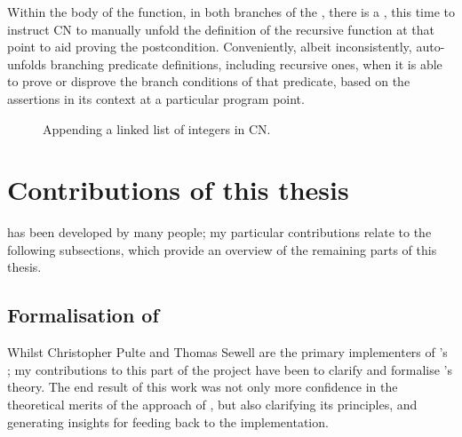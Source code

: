 Within the body of the function, in both branches of the , there is
a , this time to instruct CN to manually unfold the definition
of the recursive function at that point to aid proving the postcondition.
Conveniently, albeit
inconsistently,
 auto-unfolds branching predicate definitions, including recursive ones,
when it is able to prove or disprove the branch conditions of that predicate,
based on the assertions in its context at a particular program point.

\begin{figure}[tp]
    \begin{minipage}{.85\textwidth}
    \end{minipage}%
    \begin{minipage}{.65\textwidth}
    \end{minipage}
    \caption{Appending a linked list of integers in CN.}\label{fig:append-cn}
\end{figure}%

\section{Contributions of this thesis}\label{sec:contributions}

 has been developed by many people; my particular contributions relate
to the following subsections, which provide an overview of the remaining parts
of this thesis.

\subsection{Formalisation of }

Whilst Christopher Pulte and Thomas Sewell are the primary implementers of
's ; my contributions to this part of the project have
been to clarify and formalise 's theory. The end result of this work was
not only more confidence in the theoretical merits of the approach of ,
but also clarifying its principles, and generating insights for feeding back to
the implementation.

